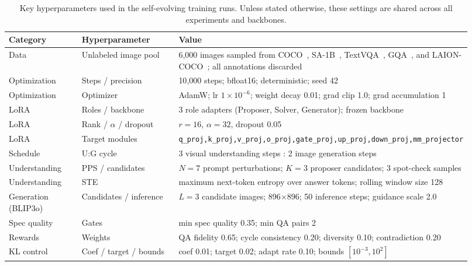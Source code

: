 \begin{table}[!htb]
  \caption{Key hyperparameters used in the self-evolving training runs. Unless stated otherwise, these settings are shared across all experiments and backbones.}
  \label{tab:sup_hyperparams}
  \centering
  \small
  \setlength{\tabcolsep}{4pt}
  \renewcommand{\arraystretch}{1.05}
  \begin{tabular}{@{}p{0.17\linewidth}p{0.23\linewidth}p{0.52\linewidth}@{}}
    \toprule
    Category & Hyperparameter & Value \\
    \midrule
    Data & Unlabeled image pool & 6{,}000 images sampled from COCO~\cite{lin2014microsoft}, SA-1B~\cite{kirillov2023segment}, TextVQA~\cite{singh2019textvqa}, GQA~\cite{hudson2019gqa}, and LAION-COCO~\cite{schuhmann2022laioncoco}; all annotations discarded \\
    Optimization & Steps / precision & 10{,}000 steps; bfloat16; deterministic; seed 42 \\
    Optimization & Optimizer & AdamW; lr $1\times10^{-6}$; weight decay 0.01; grad clip 1.0; grad accumulation 1 \\
    LoRA & Roles / backbone & 3 role adapters (Proposer, Solver, Generator); frozen backbone \\
    LoRA & Rank / $\alpha$ / dropout & $r=16$, $\alpha=32$, dropout 0.05 \\
    LoRA & Target modules & \texttt{q\_proj,\allowbreak k\_proj,\allowbreak v\_proj,\allowbreak o\_proj,\allowbreak gate\_proj,\allowbreak up\_proj,\allowbreak down\_proj,\allowbreak mm\_projector} \\
    Schedule & U:G cycle & 3 visual understanding steps : 2 image generation steps \\
    Understanding & PPS / candidates & $N=7$ prompt perturbations; $K=3$ proposer candidates; 3 spot-check samples \\
    Understanding & STE & maximum next-token entropy over answer tokens; rolling window size 128 \\
    Generation (BLIP3o) & Candidates / inference & $L=3$ candidate images; 896$\times$896; 50 inference steps; guidance scale 2.0 \\
    Spec quality & Gates & min spec quality 0.35; min QA pairs 2 \\
    Rewards & Weights & QA fidelity 0.65; cycle consistency 0.20; diversity 0.10; contradiction 0.20 \\
    KL control & Coef / target / bounds & coef 0.01; target 0.02; adapt rate 0.10; bounds $[10^{-3},10^{2}]$ \\
    \bottomrule
  \end{tabular}
\end{table}
